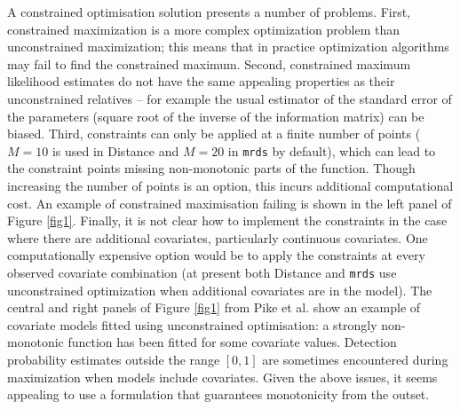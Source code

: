 \documentclass[10pt]{article}
\begin{document}
A constrained optimisation solution presents a number of problems. First, constrained maximization is a more complex optimization problem than unconstrained maximization; this means that in practice optimization algorithms may fail to find the constrained maximum.  Second, constrained maximum likelihood estimates do not have the same appealing properties as their unconstrained relatives -- for example the usual estimator of the standard error of the parameters (square root of the inverse of the information matrix) can be biased.  Third, constraints can only be applied at a finite number of points ($M=10$ is used in Distance and $M=20$ in \texttt{mrds} by default), which can lead to the constraint points missing non-monotonic parts of the function. Though increasing the number of points is an option, this incurs additional computational cost. An example of constrained maximisation failing is shown in the left panel of Figure \ref{fig1}. Finally, it is not clear how to implement the constraints in the case where there are additional covariates, particularly continuous covariates. One computationally expensive option would be to apply the constraints at every observed covariate combination (at present both Distance and \texttt{mrds} use unconstrained optimization when additional covariates are in the model). The central and right panels of Figure \ref{fig1} from Pike et al. \cite{Pike:2003ug} show an example of covariate models fitted using unconstrained optimisation: a strongly non-monotonic function has been fitted for some covariate values. Detection probability estimates outside the range $[0,1]$ are sometimes encountered during maximization when models include covariates. Given the above issues, it seems appealing to use a formulation that guarantees monotonicity from the outset.
\end{document}
